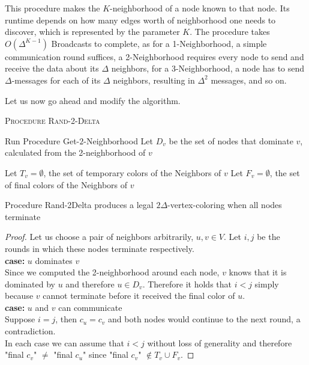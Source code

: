 This procedure makes the $K$-neighborhood of a node known to that node. Its runtime depends on how many edges worth of neighborhood one needs to discover, which is represented by the parameter $K$. The procedure takes $O(\Delta^{K-1})$ Broadcasts to complete, as for a 1-Neighborhood, a simple communication round suffices, a 2-Neighborhood requires every node to send and receive the data about its $\Delta$ neighbors, for a 3-Neighborhood, a node has to send $\Delta$-messages for each of its $\Delta$ neighbors, resulting in $\Delta^2$ messages, and so on.

Let us now go ahead and modify the algorithm.
\begin{algorithm}[ht]
\DontPrintSemicolon 
\caption{\textsc{Procedure Rand-2-Delta}}\label{alg:r2d}

Run Procedure Get-$2$-Neighborhood \;
Let $D_v$ be the set of nodes that dominate $v$, calculated from the 2-neighborhood of $v$\;

Let $T_v = \emptyset$, the set of temporary colors of the Neighbors of $v$\;
Let $F_v = \emptyset$, the set of final colors of the Neighbors of $v$\;



\end{algorithm}

\begin{theorem}
\label{theorem:r2dproof}
  Procedure Rand-2Delta produces a legal $2\Delta$-vertex-coloring when all nodes terminate
\end{theorem}
\begin{proof}
  Let us choose a pair of neighbors arbitrarily, $u,v \in V$. Let $i,j$ be the rounds in which these nodes terminate respectively.
	\\ \textbf{case:} $u$ dominates $v$ \\
	Since we computed the 2-neighborhood around each node, $v$ knows that it is dominated by $u$ and therefore $u\in D_v$.
	Therefore it holds that $i<j$ simply because $v$ cannot terminate before it received the final color of $u$.
	\\ \textbf{case:} $u$ and $v$ can communicate \\
	Suppose $i=j$, then $c_u = c_v$ and both nodes would continue to the next round, a contradiction.\\
	In each case we can assume that $i<j$ without loss of generality and therefore "final $c_v$" $\neq$ "final $c_u$" since "final $c_v$" $\notin T_v \cup F_v$.
\end{proof}

